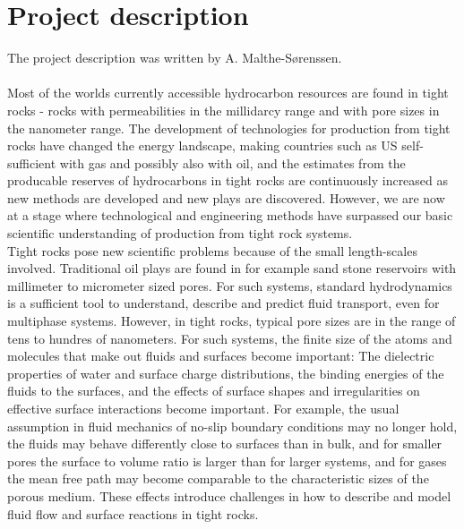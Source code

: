\section{Project description}
The project description was written by A. Malthe-S{\o}renssen.\\
\\
Most of the worlds currently accessible hydrocarbon resources are found in tight rocks - rocks with permeabilities in the millidarcy range and with pore sizes in the nanometer range. The development of technologies for production from tight rocks have changed the energy landscape, making countries such as US self-sufficient with gas and possibly also with oil, and the estimates from the producable reserves of hydrocarbons in tight rocks are continuously increased as new methods are developed and new plays are discovered. However, we are now at a stage where technological and engineering methods have surpassed our basic scientific understanding of production from tight rock systems.\\
Tight rocks pose new scientific problems because of the small length-scales involved. Traditional oil plays are found in for example sand stone reservoirs with millimeter to micrometer sized pores. For such systems, standard hydrodynamics is a sufficient tool to understand, describe and predict fluid transport, even for multiphase systems. However, in tight rocks, typical pore sizes are in the range of tens to hundres of nanometers. For such systems, the finite size of the atoms and molecules that make out fluids and surfaces become important: The dielectric properties of water and surface charge distributions, the binding energies of the fluids to the surfaces, and the effects of surface shapes and irregularities on effective surface interactions become important. For example, the usual assumption in fluid mechanics of no-slip boundary conditions may no longer hold, the fluids may behave differently close to surfaces than in bulk, and for smaller pores the surface to volume ratio is larger than for larger systems, and for gases the mean free path may become comparable to the characteristic sizes of the porous medium. These effects introduce challenges in how to describe and model fluid flow and surface reactions in tight rocks.\\

